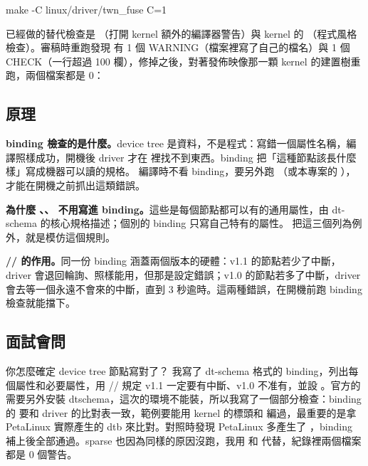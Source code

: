 \begin{cmdline}
make -C linux/driver/twn_fuse C=1
\end{cmdline}

已經做的替代檢查是 （打開 kernel 額外的編譯器警告）與 kernel 的 （程式風格檢查）。審稿時重跑發現  有 1 個 WARNING（檔案裡寫了自己的檔名）與 1 個 CHECK（一行超過 100 欄），修掉之後，對著發佈映像那一顆 kernel 的建置樹重跑，兩個檔案都是 0：


\subsection{原理}

\textbf{binding 檢查的是什麼。}device tree 是資料，不是程式：寫錯一個屬性名稱，編譯照樣成功，開機後 driver 才在  裡找不到東西。binding 把「這種節點該長什麼樣」寫成機器可以讀的規格。 編譯時不看 binding，要另外跑 （或本專案的 ），才能在開機之前抓出這類錯誤。

\textbf{為什麼 、、 不用寫進 binding。}這些是每個節點都可以有的通用屬性，由 dt-schema 的核心規格描述；個別的 binding 只寫自己特有的屬性。 把這三個列為例外，就是模仿這個規則。

\textbf{// 的作用。}同一份 binding 涵蓋兩個版本的硬體：v1.1 的節點若少了中斷，driver 會退回輪詢、照樣能用，但那是設定錯誤；v1.0 的節點若多了中斷，driver 會去等一個永遠不會來的中斷，直到 3 秒逾時。這兩種錯誤，在開機前跑 binding 檢查就能擋下。

\subsection{面試會問}

\begin{qa}{你怎麼確定 device tree 節點寫對了？}
我寫了 dt-schema 格式的 binding，列出每個屬性和必要屬性，用 // 規定 v1.1 一定要有中斷、v1.0 不准有，並設 。官方的  需要另外安裝 dtschema，這次的環境不能裝，所以我寫了一個部分檢查：binding 的  要和 driver 的比對表一致，範例要能用 kernel 的標頭和  編過，最重要的是拿 PetaLinux 實際產生的 dtb 來比對。對照時發現 PetaLinux 多產生了 ，binding 補上後全部通過。sparse 也因為同樣的原因沒跑，我用  和  代替，紀錄裡兩個檔案都是 0 個警告。
\end{qa}

